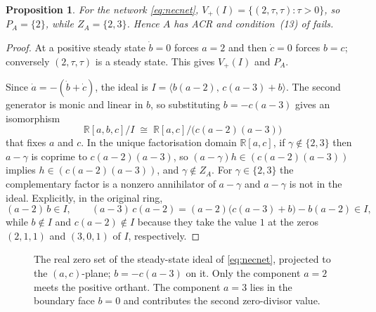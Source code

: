\documentclass[11pt,a4paper]{article}
\theoremstyle{plain}
\newtheorem{proposition}[theorem]{Proposition}
\theoremstyle{definition}
\theoremstyle{remark}
\newcommand{\R}{\mathbb{R}}
\begin{document}
\begin{proposition}\label{prop:necessity}
For the network \eqref{eq:necnet}, $V_+(I)=\{(2,\tau,\tau):\tau>0\}$, so $P_A=\{2\}$, while $Z_A=\{2,3\}$. Hence $A$ has ACR and condition~(13) of \cite{acr} fails.
\end{proposition}
\begin{proof}
At a positive steady state $\dot b=0$ forces $a=2$ and then $\dot c=0$ forces $b=c$; conversely $(2,\tau,\tau)$ is a steady state. This gives $V_+(I)$ and $P_A$.

Since $\dot a=-(\dot b+\dot c)$, the ideal is $I=\langle b(a-2),\,c(a-3)+b\rangle$. The second generator is monic and linear in $b$, so substituting $b=-c(a-3)$ gives an isomorphism
\[
  \R[a,b,c]/I\;\cong\;\R[a,c]/\bigl(c(a-2)(a-3)\bigr)
\]
that fixes $a$ and $c$. In the unique factorisation domain $\R[a,c]$, if $\gamma\notin\{2,3\}$ then $a-\gamma$ is coprime to $c(a-2)(a-3)$, so $(a-\gamma)h\in(c(a-2)(a-3))$ implies $h\in(c(a-2)(a-3))$, and $\gamma\notin Z_A$. For $\gamma\in\{2,3\}$ the complementary factor is a nonzero annihilator of $a-\gamma$ and $a-\gamma$ is not in the ideal. Explicitly, in the original ring,
\[
 (a-2)\,b\in I,\qquad (a-3)\,c(a-2)=(a-2)\bigl(c(a-3)+b\bigr)-b(a-2)\in I,
\]
while $b\notin I$ and $c(a-2)\notin I$ because they take the value $1$ at the zeros $(2,1,1)$ and $(3,0,1)$ of $I$, respectively.
\end{proof}

\begin{figure}[ht]
\centering
{}
\caption{The real zero set of the steady-state ideal of \eqref{eq:necnet}, projected to the $(a,c)$-plane; $b=-c(a-3)$ on it. Only the component $a=2$ meets the positive orthant. The component $a=3$ lies in the boundary face $b=0$ and contributes the second zero-divisor value.}\label{fig:necessity}
\end{figure}
\end{document}

